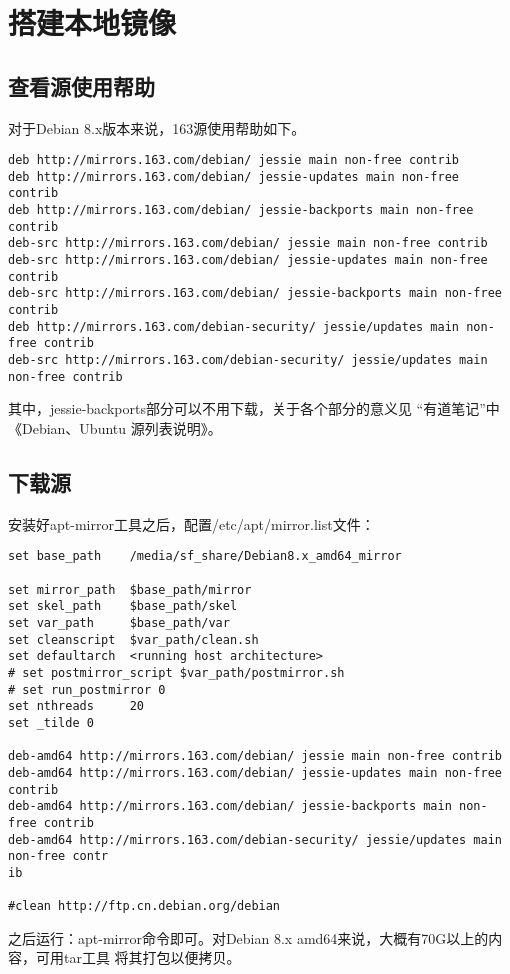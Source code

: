 ﻿\chapter{搭建本地镜像}\label{chapter:mirror}

\section{查看源使用帮助}

对于Debian 8.x版本来说，163源使用帮助如下。
\begin{Verbatim}[]
deb http://mirrors.163.com/debian/ jessie main non-free contrib
deb http://mirrors.163.com/debian/ jessie-updates main non-free contrib
deb http://mirrors.163.com/debian/ jessie-backports main non-free contrib
deb-src http://mirrors.163.com/debian/ jessie main non-free contrib
deb-src http://mirrors.163.com/debian/ jessie-updates main non-free contrib
deb-src http://mirrors.163.com/debian/ jessie-backports main non-free contrib
deb http://mirrors.163.com/debian-security/ jessie/updates main non-free contrib
deb-src http://mirrors.163.com/debian-security/ jessie/updates main non-free contrib
\end{Verbatim}

其中，jessie-backports部分可以不用下载，关于各个部分的意义见%
“有道笔记”中《Debian、Ubuntu 源列表说明》。

\section{下载源}
安装好apt-mirror工具之后，配置/etc/apt/mirror.list文件：
\begin{Verbatim}[]
set base_path    /media/sf_share/Debian8.x_amd64_mirror

set mirror_path  $base_path/mirror
set skel_path    $base_path/skel
set var_path     $base_path/var
set cleanscript  $var_path/clean.sh
set defaultarch  <running host architecture>
# set postmirror_script $var_path/postmirror.sh
# set run_postmirror 0
set nthreads     20
set _tilde 0

deb-amd64 http://mirrors.163.com/debian/ jessie main non-free contrib
deb-amd64 http://mirrors.163.com/debian/ jessie-updates main non-free contrib
deb-amd64 http://mirrors.163.com/debian/ jessie-backports main non-free contrib
deb-amd64 http://mirrors.163.com/debian-security/ jessie/updates main non-free contr
ib

#clean http://ftp.cn.debian.org/debian
\end{Verbatim}
之后运行：apt-mirror命令即可。对Debian 8.x amd64来说，大概有70G以上的内容，可用tar工具%
将其打包以便拷贝。

